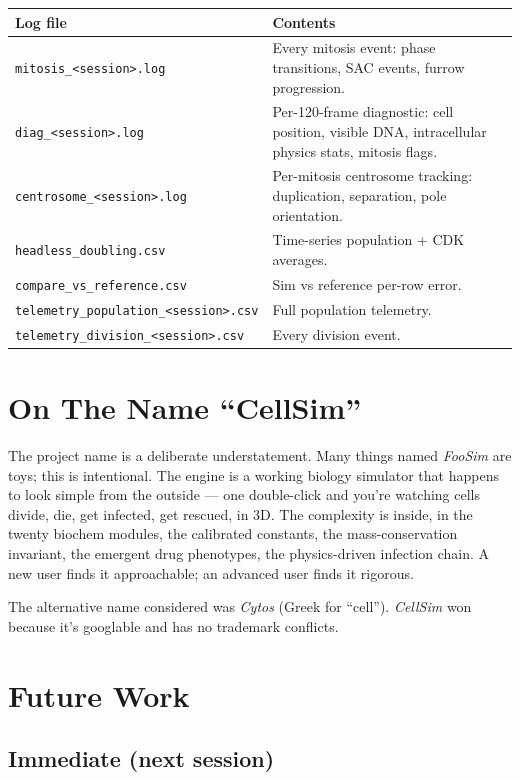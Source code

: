\documentclass[11pt,letterpaper,twoside,openany]{book}
\newcommand{\file}[1]{\texttt{\small#1}}
\begin{document}
\begin{longtable}{p{5.5cm}p{8.0cm}}
\toprule
\textbf{Log file} & \textbf{Contents}\\ \midrule
\file{mitosis\_<session>.log}    & Every mitosis event: phase transitions, SAC events, furrow progression.\\
\file{diag\_<session>.log}       & Per-120-frame diagnostic: cell position, visible DNA, intracellular physics stats, mitosis flags.\\
\file{centrosome\_<session>.log} & Per-mitosis centrosome tracking: duplication, separation, pole orientation.\\
\file{headless\_doubling.csv}    & Time-series population + CDK averages.\\
\file{compare\_vs\_reference.csv}& Sim vs reference per-row error.\\
\file{telemetry\_population\_<session>.csv} & Full population telemetry.\\
\file{telemetry\_division\_<session>.csv}   & Every division event.\\
\bottomrule
\end{longtable}

\chapter{On The Name ``CellSim''}
\label{ch:name}

The project name is a deliberate understatement. Many things named
\emph{FooSim} are toys; this is intentional. The engine is a
working biology simulator that happens to look simple from the
outside --- one double-click and you're watching cells divide, die,
get infected, get rescued, in 3D. The complexity is inside, in the
twenty biochem modules, the calibrated constants, the
mass-conservation invariant, the emergent drug phenotypes, the
physics-driven infection chain. A new user finds it approachable;
an advanced user finds it rigorous.

The alternative name considered was \emph{Cytos} (Greek for
``cell''). \emph{CellSim} won because it's googlable and has no
trademark conflicts.

\chapter{Future Work}
\label{ch:future}

\section{Immediate (next session)}
\end{document}

